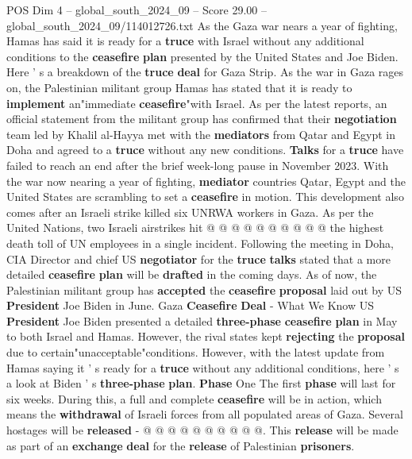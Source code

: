 \begin{textsample}{POS Dim 4 – global\_south\_2024\_09 – Score 29.00 – global\_south\_2024\_09/114012726.txt}  \label{ex:f4_pos_291}
As the Gaza war nears a year of fighting, Hamas has said it is ready for a \textbf{truce} with Israel without any additional conditions to the \textbf{ceasefire} \textbf{plan} presented by the United States and Joe Biden.
Here ' s a breakdown of the \textbf{truce} \textbf{deal} for Gaza Strip.
As the war in Gaza rages on, the Palestinian militant group Hamas has stated that it is ready to \textbf{implement} an"immediate \textbf{ceasefire}"with Israel.
As per the latest reports, an official statement from the militant group has confirmed that their \textbf{negotiation} team led by Khalil al-Hayya met with the \textbf{mediators} from Qatar and Egypt in Doha and agreed to a \textbf{truce} without any new conditions. \textbf{Talks} for a \textbf{truce} have failed to reach an end after the brief week-long pause in November 2023.
With the war now nearing a year of fighting, \textbf{mediator} countries Qatar, Egypt and the United States are scrambling to set a \textbf{ceasefire} in motion.
This development also comes after an Israeli strike killed six UNRWA workers in Gaza.
As per the United Nations, two Israeli airstrikes hit @ @ @ @ @ @ @ @ @ @ the highest death toll of UN employees in a single incident.
Following the meeting in Doha, CIA Director and chief US \textbf{negotiator} for the \textbf{truce} \textbf{talks} stated that a more detailed \textbf{ceasefire} \textbf{plan} will be \textbf{drafted} in the coming days.
As of now, the Palestinian militant group has \textbf{accepted} the \textbf{ceasefire} \textbf{proposal} laid out by US \textbf{President} Joe Biden in June.
Gaza \textbf{Ceasefire} \textbf{Deal} - What We Know US \textbf{President} Joe Biden presented a detailed \textbf{three-phase} \textbf{ceasefire} \textbf{plan} in May to both Israel and Hamas.
However, the rival states kept \textbf{rejecting} the \textbf{proposal} due to certain"unacceptable"conditions.
However, with the latest update from Hamas saying it ' s ready for a \textbf{truce} without any additional conditions, here ' s a look at Biden ' s \textbf{three-phase} \textbf{plan}. \textbf{Phase} One The first \textbf{phase} will last for six weeks.
During this, a full and complete \textbf{ceasefire} will be in action, which means the \textbf{withdrawal} of Israeli forces from all populated areas of Gaza.
Several hostages will be \textbf{released} - @ @ @ @ @ @ @ @ @ @.
This \textbf{release} will be made as part of an \textbf{exchange} \textbf{deal} for the \textbf{release} of Palestinian \textbf{prisoners}.

\end{textsample}
